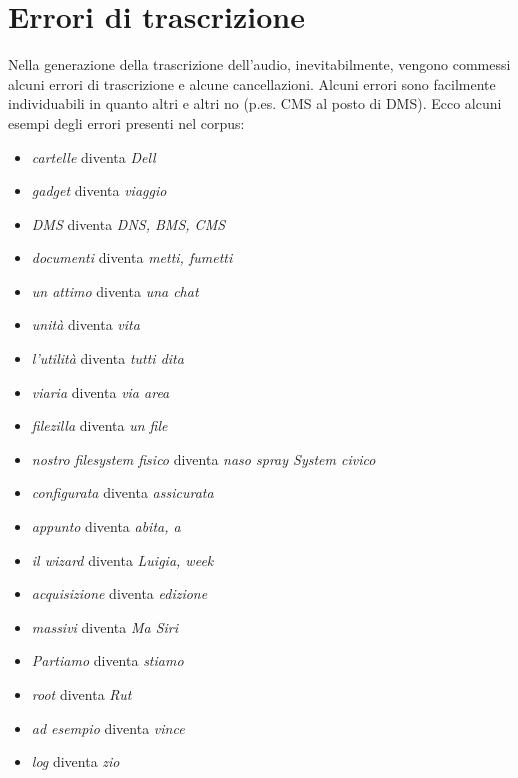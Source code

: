 
\chapter{Errori di trascrizione}
\label{cap:esempi-errori}
Nella generazione della trascrizione dell'audio, inevitabilmente, vengono commessi alcuni errori di trascrizione e alcune cancellazioni. Alcuni errori sono facilmente individuabili in quanto altri e altri no (p.es. CMS al posto di DMS). Ecco alcuni esempi degli errori presenti nel corpus:
\begin{itemize}
    \item \textit{cartelle} diventa \textit{Dell}
    \item \textit{gadget} diventa \textit{viaggio}
    \item \textit{DMS} diventa \textit{DNS, BMS, CMS}
    \item \textit{documenti} diventa \textit{metti, fumetti}
    \item \textit{un attimo} diventa \textit{una chat}
    \item \textit{unità} diventa \textit{vita}
    \item \textit{l’utilità} diventa \textit{tutti dita}
    \item \textit{viaria} diventa \textit{via area}
    \item \textit{filezilla} diventa \textit{un file}
    \item \textit{nostro filesystem fisico} diventa \textit{naso spray System civico}
    \item \textit{configurata} diventa \textit{assicurata}
    \item \textit{appunto} diventa \textit{abita, a}
    \item \textit{il wizard} diventa \textit{Luigia, week}
    \item \textit{acquisizione} diventa \textit{edizione}
    \item \textit{massivi} diventa \textit{Ma Siri}
    \item \textit{Partiamo} diventa \textit{stiamo}
    \item \textit{root} diventa  \textit{Rut}
    \item \textit{ad esempio} diventa \textit{vince}
    \item \textit{log} diventa \textit{zio}

\end{itemize}
